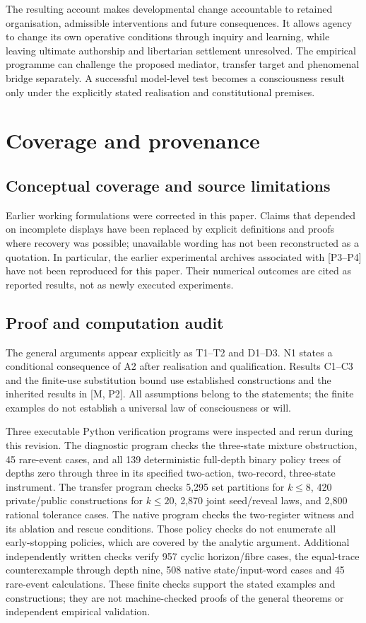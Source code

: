 \documentclass[
  11pt,
  a4paper,
]{article}
\begin{document}
The resulting account makes developmental change accountable to retained
organisation, admissible interventions and future consequences. It
allows agency to change its own operative conditions through inquiry and
learning, while leaving ultimate authorship and libertarian settlement
unresolved. The empirical programme can challenge the proposed mediator,
transfer target and phenomenal bridge separately. A successful
model-level test becomes a consciousness result only under the
explicitly stated realisation and constitutional premises.

\section{Coverage and provenance}\label{coverage-and-provenance}
\subsection{Conceptual coverage and source limitations}\label{conceptual-coverage-and-source-limitations}
Earlier working formulations were corrected in this paper. Claims that depended on incomplete displays have been replaced by explicit definitions and proofs where recovery was possible; unavailable wording has not been reconstructed as a quotation. In particular, the earlier experimental archives associated with {[}P3--P4{]} have not been reproduced for this paper. Their numerical outcomes are cited as reported results, not as newly executed experiments.

\subsection{Proof and computation
audit}\label{proof-and-computation-audit}

The general arguments appear explicitly as T1--T2 and D1--D3. N1 states
a conditional consequence of A2 after realisation and qualification.
Results C1--C3 and the finite-use substitution bound use established
constructions and the inherited results in {[}M, P2{]}. All assumptions
belong to the statements; the finite examples do not establish a
universal law of consciousness or will.

Three executable Python verification programs were inspected and rerun
during this revision. The diagnostic program checks the
three-state mixture obstruction, 45 rare-event cases, and all 139
deterministic full-depth binary policy trees of depths zero through
three in its specified two-action, two-record, three-state instrument.
The transfer program checks 5,295 set partitions for \(k\le8\), 420
private/public constructions for \(k\le20\), 2,870 joint seed/reveal
laws, and 2,800 rational tolerance cases. The native program checks the
two-register witness and its ablation and rescue conditions. Those policy
checks do not enumerate all early-stopping policies, which are covered
by the analytic argument. Additional independently written checks verify
957 cyclic horizon/fibre cases, the equal-trace counterexample through
depth nine, 508 native state/input-word cases and 45 rare-event
calculations. These finite checks support the stated examples and
constructions; they are not machine-checked proofs of the general
theorems or independent empirical validation.
\end{document}
